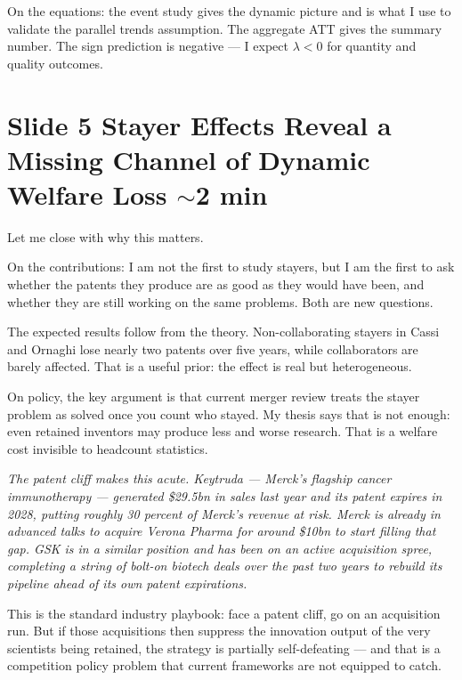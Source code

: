 \documentclass[11pt,a4paper]{article}
\newcommand{\example}[1]{%
  \begin{trivlist}
    \item\relax
    \colorbox{examplebg}{\parbox{\dimexpr\linewidth-2\fboxsep}%
      {\small\itshape\color{darkblue!80} #1}}
  \end{trivlist}%
}
\begin{document}
On the equations: the event study gives the dynamic picture and is what I use to validate the parallel trends assumption. The aggregate ATT gives the summary number. The sign prediction is negative --- I expect $\lambda < 0$ for quantity and quality outcomes.

\section*{Slide 5 \quad Stayer Effects Reveal a Missing Channel of Dynamic Welfare Loss \hfill{\normalfont\small\color{midgray}$\sim$2 min}}

Let me close with why this matters.

On the contributions: I am not the first to study stayers, but I am the first to ask whether the patents they produce are as good as they would have been, and whether they are still working on the same problems. Both are new questions.

The expected results follow from the theory. Non-collaborating stayers in Cassi and Ornaghi lose nearly two patents over five years, while collaborators are barely affected. That is a useful prior: the effect is real but heterogeneous.

On policy, the key argument is that current merger review treats the stayer problem as solved once you count who stayed. My thesis says that is not enough: even retained inventors may produce less and worse research. That is a welfare cost invisible to headcount statistics.

\example{The patent cliff makes this acute. Keytruda --- Merck's flagship cancer immunotherapy --- generated \$29.5bn in sales last year and its patent expires in 2028, putting roughly 30 percent of Merck's revenue at risk. Merck is already in advanced talks to acquire Verona Pharma for around \$10bn to start filling that gap. GSK is in a similar position and has been on an active acquisition spree, completing a string of bolt-on biotech deals over the past two years to rebuild its pipeline ahead of its own patent expirations.

This is the standard industry playbook: face a patent cliff, go on an acquisition run. But if those acquisitions then suppress the innovation output of the very scientists being retained, the strategy is partially self-defeating --- and that is a competition policy problem that current frameworks are not equipped to catch.}
\end{document}
